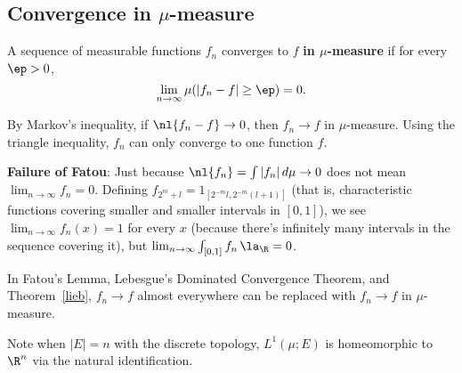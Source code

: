 \subsection{Convergence in $\mu$-measure}
%
%

\begin{df}
A sequence of measurable functions $f_n$ converges to $f$ {\bf in $\mu$-measure} if for every $\ep>0$, 
\[\lim_{n\to \infty}\mu(|f_n-f|\ge \ep)=0.
\]
\end{df}
By Markov's inequality, if $\nl{f_n-f}\to 0$, then $f_n\to f$ in $\mu$-measure.
Using the triangle inequality, $f_n$ can only converge to one function $f$.

\textbf{Failure of Fatou}: Just because $\nl{f_n}=\int |f_n|\,d\mu \to 0$ does not mean $\lim_{n\to \infty} f_n=0$. 
Defining $f_{2^m+l}=1_{[2^{-m}l,2^{-m}(l+1)]}$ (that is, characteristic functions covering smaller and smaller intervals in $[0,1]$), we see $\lim_{n\to \infty} f_n(x)=1$ for every $x$ (because there's infinitely many intervals in the sequence covering it), but $\lim_{n\to \infty}\int_{[0,1]}f_n\,\la_{\R}=0$.

In Fatou's Lemma, Lebesgue's Dominated Convergence Theorem, and Theorem~\ref{lieb}, $f_n\to f$ almost everywhere can be replaced with $f_n\to f$ in $\mu$-measure.

Note when $|E|=n$ with the discrete topology, $L^1(\mu;E)$ is homeomorphic to $\R^n$ via the natural identification.


